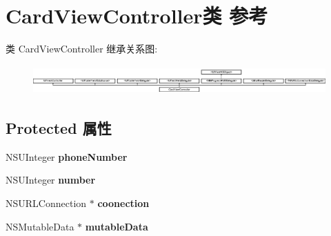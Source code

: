 \hypertarget{interface_card_view_controller}{\section{Card\-View\-Controller类 参考}
\label{interface_card_view_controller}
}
类 Card\-View\-Controller 继承关系图\-:\begin{figure}[H]
\begin{center}
\leavevmode
\includegraphics[height=1.121495cm]{interface_card_view_controller}
\end{center}
\end{figure}
\subsection*{Protected 属性}
\begin{DoxyCompactItemize}
\item 
\hypertarget{interface_card_view_controller_a76e1ba3eb19518e13d416ce0714e7759}{N\-S\-U\-Integer {\bfseries phone\-Number}}\label{interface_card_view_controller_a76e1ba3eb19518e13d416ce0714e7759}

\item 
\hypertarget{interface_card_view_controller_af44eabe7b7c82a5a2b17ca65f3483a0c}{N\-S\-U\-Integer {\bfseries number}}\label{interface_card_view_controller_af44eabe7b7c82a5a2b17ca65f3483a0c}

\item 
\hypertarget{interface_card_view_controller_a85acd70cfad1ea3a5d70b5ce63bc017a}{N\-S\-U\-R\-L\-Connection $\ast$ {\bfseries coonection}}\label{interface_card_view_controller_a85acd70cfad1ea3a5d70b5ce63bc017a}

\item 
\hypertarget{interface_card_view_controller_a475588d8d26a77900f0bd3eda00488fe}{N\-S\-Mutable\-Data $\ast$ {\bfseries mutable\-Data}}\label{interface_card_view_controller_a475588d8d26a77900f0bd3eda00488fe}

\end{DoxyCompactItemize}
